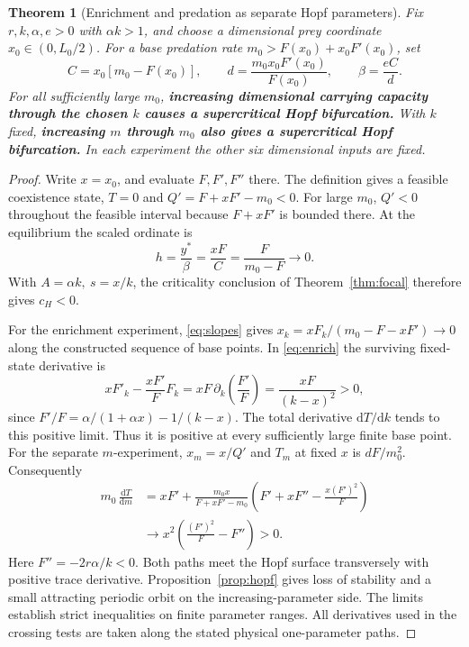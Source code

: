 \documentclass[12pt,a4paper,twoside,fleqn]{article}
\theoremstyle{journal}
\newtheorem{theorem}{Theorem}
\newcommand{\claim}[1]{{\normalfont\bfseries\boldmath #1}}
\newcommand{\dd}{\mathrm{d}}
\begin{document}
\begin{theorem}[Enrichment and predation as separate Hopf parameters]\label{thm:enrich}
Fix \(r,k,\alpha,e>0\) with \(\alpha k>1\), and choose a dimensional prey coordinate \(x_0\in(0,L_0/2)\). For a base predation rate \(m_0>F(x_0)+x_0F'(x_0)\), set
\begin{equation}\label{eq:enrichfamily}
 C=x_0[m_0-F(x_0)],\qquad
 d=\frac{m_0 x_0 F'(x_0)}{F(x_0)},\qquad
 \beta=\frac{eC}{d}.
\end{equation}
For all sufficiently large \(m_0\), \claim{increasing dimensional carrying capacity through the chosen \(k\) causes a supercritical Hopf bifurcation.} With \(k\) fixed, \claim{increasing \(m\) through \(m_0\) also gives a supercritical Hopf bifurcation.} In each experiment the other six dimensional inputs are fixed.
\end{theorem}
\begin{proof}
Write \(x=x_0\), and evaluate \(F,F',F''\) there. The definition gives a feasible coexistence state, \(T=0\) and \(Q'=F+xF'-m_0<0\). For large \(m_0\), \(Q'<0\) throughout the feasible interval because \(F+xF'\) is bounded there. At the equilibrium the scaled ordinate is
\[
 h=\frac{y^*}{\beta}=\frac{xF}{C}=\frac{F}{m_0-F}\longrightarrow0 .
\]
With \(A=\alpha k,\ s=x/k\), the criticality conclusion of Theorem~\ref{thm:focal} therefore gives \(c_H<0\).

For the enrichment experiment, \eqref{eq:slopes} gives \(x_k=x F_k/(m_0-F-xF')\to0\) along the constructed sequence of base points. In \eqref{eq:enrich} the surviving fixed-state derivative is
\begin{equation}\label{eq:enrichlimit}
 xF'_k-\frac{xF'}{F}F_k
  =xF\,\partial_k\!\left(\frac{F'}{F}\right)
  =\frac{xF}{(k-x)^2}>0,
\end{equation}
since \(F'/F=\alpha/(1+\alpha x)-1/(k-x)\). The total derivative \(\dd T/\dd k\) tends to this positive limit. Thus it is positive at every sufficiently large finite base point. For the separate \(m\)-experiment, \(x_m=x/Q'\) and \(T_m\) at fixed \(x\) is \(dF/m_0^2\). Consequently
\[
 \begin{aligned}
 m_0\,\frac{\dd T}{\dd m}
  &=xF'+\frac{m_0x}{F+xF'-m_0}
       \left(F'+xF''-\frac{x(F')^2}{F}\right)\\
  &\longrightarrow x^2\left(\frac{(F')^2}{F}-F''\right)>0 .
 \end{aligned}
\]
Here \(F''=-2r\alpha/k<0\). Both paths meet the Hopf surface transversely with positive trace derivative. Proposition~\ref{prop:hopf} gives loss of stability and a small attracting periodic orbit on the increasing-parameter side. The limits establish strict inequalities on finite parameter ranges. All derivatives used in the crossing tests are taken along the stated physical one-parameter paths.
\end{proof}
\end{document}

